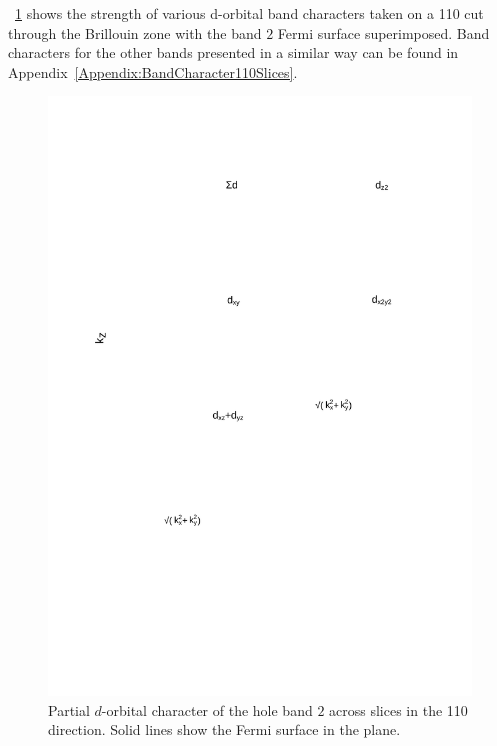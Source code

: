 \Fig~\ref{Fig:3:Band2DCharacter} shows the strength of various d-orbital band characters taken on a 110 cut through the \BaFeP Brillouin zone with the band $2$ Fermi surface superimposed. Band characters for the other bands presented in a similar way can be found in Appendix~\ref{Appendix:BandCharacter110Slices}.
\begin{figure}[htbp]
    \begin{center}
        \includegraphics[scale=0.5]{Chapter3-dHvABaFe2P2/Figures/AngleDepMeasurements/BandCharacterPlot/Band2_110Slice_BandCharacter}
        \caption{Partial $d$-orbital character of the hole band $2$ across slices in the 110 direction. Solid lines show the Fermi surface in the plane.}
        \label{Fig:3:Band2DCharacter}
    \end{center}
\end{figure}

